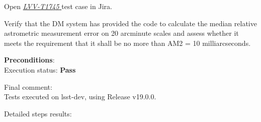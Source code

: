 \documentclass[DM,lsstdraft,STR,toc]{lsstdoc}
\begin{document}
Open  \href{https://jira.lsstcorp.org/secure/Tests.jspa#/testCase/LVV-T1745}{\textit{ LVV-T1745 } }
test case in Jira.

 Verify that the DM system has provided the code to calculate the median
relative astrometric measurement error on 20 arcminute scales and assess
whether it meets the requirement that it shall be no more than AM2 = 10
milliarcseconds.


\textbf{ Preconditions}:\\
 


Execution status: {\bf Pass }

Final comment:\\ Tests executed on lsst-dev, using Release v19.0.0.



Detailed steps results:
\end{document}
